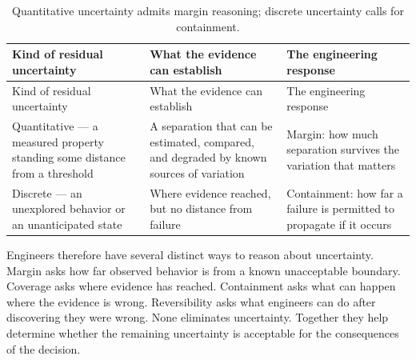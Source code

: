\begin{longtable}[]{@{}
  >{\raggedright\arraybackslash}p{}
  >{\raggedright\arraybackslash}p{}
  >{\raggedright\arraybackslash}p{}@{}}
\caption{Quantitative uncertainty admits margin reasoning; discrete uncertainty calls for containment.}\label{tbl-margin-containment}\tabularnewline
\toprule\noalign{}
\begin{minipage}[b]{\linewidth}\raggedright
Kind of residual uncertainty
\end{minipage} & \begin{minipage}[b]{\linewidth}\raggedright
What the evidence can establish
\end{minipage} & \begin{minipage}[b]{\linewidth}\raggedright
The engineering response
\end{minipage} \\
\midrule\noalign{}
\endfirsthead
\toprule\noalign{}
\begin{minipage}[b]{\linewidth}\raggedright
Kind of residual uncertainty
\end{minipage} & \begin{minipage}[b]{\linewidth}\raggedright
What the evidence can establish
\end{minipage} & \begin{minipage}[b]{\linewidth}\raggedright
The engineering response
\end{minipage} \\
\midrule\noalign{}
\endhead
\bottomrule\noalign{}
\endlastfoot
Quantitative --- a measured property standing some distance from a threshold & A separation that can be estimated, compared, and degraded by known sources of variation & Margin: how much separation survives the variation that matters \\
Discrete --- an unexplored behavior or an unanticipated state & Where evidence reached, but no distance from failure & Containment: how far a failure is permitted to propagate if it occurs \\
\end{longtable}

Engineers therefore have several distinct ways to reason about uncertainty. Margin asks how far
observed behavior is from a known unacceptable boundary. Coverage asks where evidence has reached.
Containment asks what can happen where the evidence is wrong. Reversibility asks what engineers can
do after discovering they were wrong. None eliminates uncertainty. Together they help determine
whether the remaining uncertainty is acceptable for the consequences of the decision.

